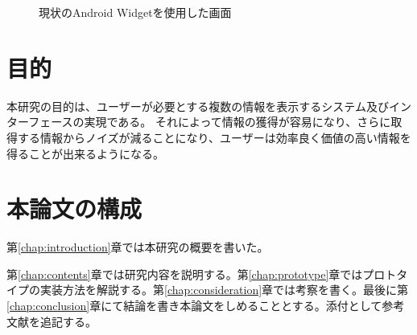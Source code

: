 \begin{figure}[htbp]
  \begin{minipage}{\hsize}
    \begin{center}
    \end{center}
    \caption{現状のAndroid Widgetを使用した画面}
    \label{fig:old_widget}
  \end{minipage}
\end{figure}

\section{目的}
本研究の目的は、ユーザーが必要とする複数の情報を表示するシステム及びインターフェースの実現である。
それによって情報の獲得が容易になり、さらに取得する情報からノイズが減ることになり、ユーザーは効率良く価値の高い情報を得ることが出来るようになる。

\section{本論文の構成}
第\ref{chap:introduction}章では本研究の概要を書いた。

第\ref{chap:contents}章では研究内容を説明する。第\ref{chap:prototype}章ではプロトタイプの実装方法を解説する。第\ref{chap:consideration}章では考察を書く。最後に第\ref{chap:conclusion}章にて結論を書き本論文をしめることとする。添付として参考文献を追記する。
